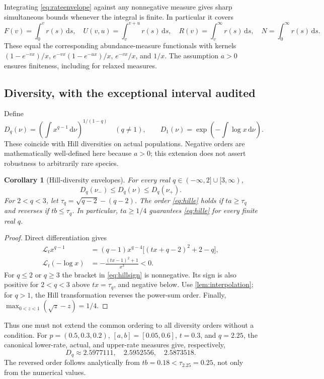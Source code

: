 \documentclass[11pt]{article}
\numberwithin{equation}{section}
\newtheorem{corollary}[corollary]{Corollary}
\theoremstyle{definition}
\theoremstyle{remark}
\newcommand{\dd}{\,\mathrm d}
\begin{document}
Integrating \eqref{eq:rateenvelope} against any nonnegative measure gives sharp simultaneous bounds whenever the integral is finite. In particular it covers
\begin{equation}\label{eq:targets}
 F(v)=\int_0^v r(s)\dd s,\quad
 U(v,u)=\int_v^{v+u}r(s)\dd s,\quad
 R(v)=\int_v^\infty r(s)\dd s,\quad
 N=\int_0^\infty r(s)\dd s.
\end{equation}
These equal the corresponding abundance-measure functionals with kernels $(1-e^{-vx})/x$, $e^{-vx}(1-e^{-ux})/x$, $e^{-vx}/x$, and $1/x$. The assumption $a>0$ ensures finiteness, including for relaxed measures.

\subsection{Diversity, with the exceptional interval audited}
Define
\[
 D_q(\nu)=\left(\int x^{q-1}\dd\nu\right)^{1/(1-q)}\quad(q\ne1),
 \qquad D_1(\nu)=\exp\left(-\int\log x\dd\nu\right).
\]
These coincide with Hill diversities on actual populations. Negative orders are mathematically well-defined here because $a>0$; this extension does not assert robustness to arbitrarily rare species.

\begin{corollary}[Hill-diversity envelopes]\label{cor:hill}
For every real $q\in(-\infty,2]\cup[3,\infty)$,
\begin{equation}\label{eq:hille}
 D_q(\nu_-)\le D_q(\nu)\le D_q(\nu_+).
\end{equation}
For $2<q<3$, let $\tau_q=\sqrt{q-2}-(q-2)$. The order \eqref{eq:hille} holds if $ta\ge\tau_q$ and reverses if $tb\le\tau_q$. In particular, $ta\ge1/4$ guarantees \eqref{eq:hille} for every finite real $q$.
\end{corollary}
\begin{proof}
Direct differentiation gives
\begin{align}
 \mathcal L_t x^{q-1}
 &=(q-1)x^{q-4}\bigl[(tx+q-2)^2+2-q\bigr],\label{eq:hillsign}\\
 \mathcal L_t(-\log x)&=-\frac{(tx-1)^2+1}{x^3}<0.
\end{align}
For $q\le2$ or $q\ge3$ the bracket in \eqref{eq:hillsign} is nonnegative. Its sign is also positive for $2<q<3$ above $tx=\tau_q$, and negative below. Use \cref{lem:interpolation}; for $q>1$, the Hill transformation reverses the power-sum order. Finally, $\max_{0<z<1}(\sqrt z-z)=1/4$.
\end{proof}
Thus one must not extend the common ordering to all diversity orders without a condition. For $p=(0.5,0.3,0.2)$, $[a,b]=[0.05,0.6]$, $t=0.3$, and $q=2.25$, the canonical lower-rate, actual, and upper-rate measures give, respectively,
\[
 D_q\approx2.5977111,\quad2.5952556,\quad2.5873518.
\]
The reversed order follows analytically from $tb=0.18<\tau_{2.25}=0.25$, not only from the numerical values.
\end{document}
